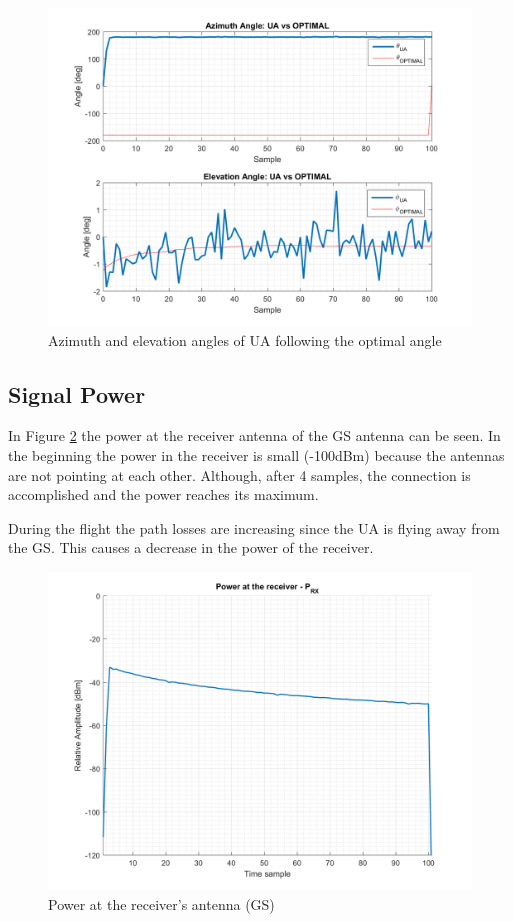 \begin{figure}[H]
	\centering
	\includegraphics[scale=0.8]{figures/s2_ua.png}
	\caption{Azimuth and elevation angles of UA following the optimal angle}
	\label{fig:s2_ua}
\end{figure}


\subsection*{Signal Power}
In Figure \ref{fig:s2_power} the power at the receiver antenna of the GS antenna can be seen. In the beginning the power in the receiver is small (-100dBm) because the antennas are not pointing at each other. Although, after 4 samples, the connection is accomplished and the power reaches its maximum. 

During the flight the path losses are increasing since the UA is flying away from the GS. This causes a decrease in the power of the receiver.

\begin{figure}[H]
	\centering
	\includegraphics[scale=0.8]{figures/s2_power.png}
	\caption{Power at the receiver's antenna (GS)}
	\label{fig:s2_power}
\end{figure}

